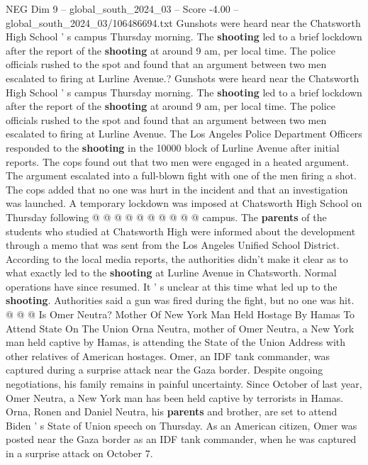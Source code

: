 \begin{textsample}{NEG Dim 9 – global\_south\_2024\_03 – Score -4.00 – global\_south\_2024\_03/106486694.txt}  \label{ex:f9_neg_371}
Gunshots were heard near the Chatsworth High School ' s campus Thursday morning.
The \textbf{shooting} led to a brief lockdown after the report of the \textbf{shooting} at around 9 am, per local time.
The police officials rushed to the spot and found that an argument between two men escalated to firing at Lurline Avenue.?
Gunshots were heard near the Chatsworth High School ' s campus Thursday morning.
The \textbf{shooting} led to a brief lockdown after the report of the \textbf{shooting} at around 9 am, per local time.
The police officials rushed to the spot and found that an argument between two men escalated to firing at Lurline Avenue.
The Los Angeles Police Department Officers responded to the \textbf{shooting} in the 10000 block of Lurline Avenue after initial reports.
The cops found out that two men were engaged in a heated argument.
The argument escalated into a full-blown fight with one of the men firing a shot.
The cops added that no one was hurt in the incident and that an investigation was launched.
A temporary lockdown was imposed at Chatsworth High School on Thursday following @ @ @ @ @ @ @ @ @ @ campus.
The \textbf{parents} of the students who studied at Chatsworth High were informed about the development through a memo that was sent from the Los Angeles Unified School District.
According to the local media reports, the authorities didn't make it clear as to what exactly led to the \textbf{shooting} at Lurline Avenue in Chatsworth.
Normal operations have since resumed.
It ' s unclear at this time what led up to the \textbf{shooting}.
Authorities said a gun was fired during the fight, but no one was hit. @ @ @ Is Omer Neutra?
Mother Of New York Man Held Hostage By Hamas To Attend State On The Union Orna Neutra, mother of Omer Neutra, a New York man held captive by Hamas, is attending the State of the Union Address with other relatives of American hostages.
Omer, an IDF tank commander, was captured during a surprise attack near the Gaza border.
Despite ongoing negotiations, his family remains in painful uncertainty.
Since October of last year, Omer Neutra, a New York man has been held captive by terrorists in Hamas.
Orna, Ronen and Daniel Neutra, his \textbf{parents} and brother, are set to attend Biden ' s State of Union speech on Thursday.
As an American citizen, Omer was posted near the Gaza border as an IDF tank commander, when he was captured in a surprise attack on October 7.

\end{textsample}
